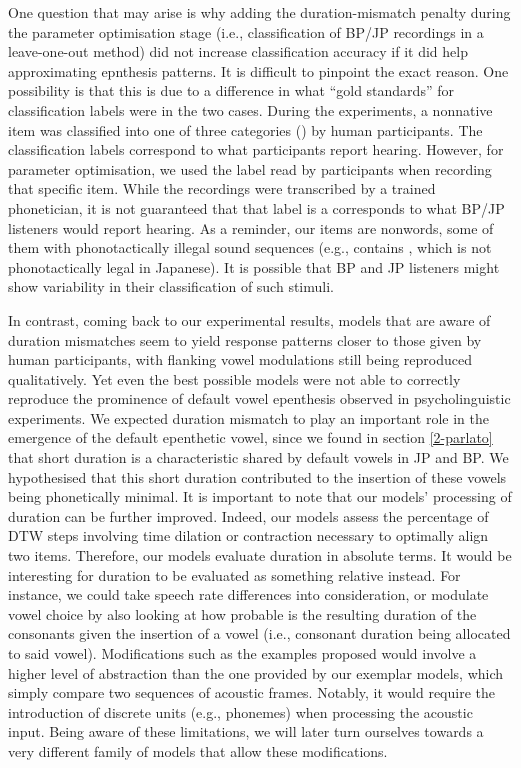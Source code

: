 One question that may arise is why adding the duration-mismatch penalty during the parameter optimisation stage (i.e., classification of BP/JP recordings in a leave-one-out method) did not increase classification accuracy if it did help approximating epnthesis patterns. It is difficult to pinpoint the exact reason. One possibility is that this is due to a difference in what ``gold standards'' for classification labels were in the two cases. During the experiments, a nonnative item was classified into one of three categories () by human participants. The classification labels correspond to what participants report hearing. However, for parameter optimisation, we used the label read by participants when recording that specific item. While the recordings were transcribed by a trained phonetician, it is not guaranteed that that label is a corresponds to what BP/JP listeners would report hearing. As a reminder, our items are nonwords, some of them with phonotactically illegal sound sequences (e.g.,  contains , which is not phonotactically legal in Japanese). It is possible that BP and JP listeners might show variability in their classification of such stimuli.    

In contrast, coming back to our experimental results, models that are aware of duration mismatches seem to yield response patterns closer to those given by human participants, with flanking vowel modulations still being reproduced qualitatively. Yet even the best possible models were not able to correctly reproduce the prominence of default vowel epenthesis observed in psycholinguistic experiments. We expected duration mismatch to play an important role in the emergence of the default epenthetic vowel, since we found in section \ref{2-parlato} that short duration is a characteristic shared by default vowels in JP and BP. We hypothesised that this short duration contributed to the insertion of these vowels being phonetically minimal.
It is important to note that our models' processing of duration can be further improved. Indeed, our models assess the percentage of DTW steps involving time dilation or contraction necessary to optimally align two items. Therefore, our models evaluate duration in absolute terms. It would be interesting for duration to be evaluated as something relative instead. For instance, we could take speech rate differences into consideration, or modulate vowel choice by also looking at how probable is the resulting duration of the consonants given the insertion of a vowel (i.e., consonant duration being allocated to said vowel). Modifications such as the examples proposed would involve a higher level of abstraction than the one provided by our exemplar models, which simply compare two sequences of acoustic frames. Notably, it would require the introduction of discrete units (e.g., phonemes) when processing the acoustic input. Being aware of these limitations, we will later turn ourselves towards a very different family of models that allow these modifications.


